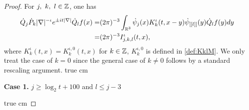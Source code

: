 \documentclass[11pt,twoside]{article}
\def\Z{\mathop{\mathbb Z\kern 0pt}\nolimits}
\def\R{\mathop{\mathbb R\kern 0pt}\nolimits}
\newcommand{\q}{\dot{Q}}
\theoremstyle{plain}
\theoremstyle{definition}
\numberwithin{equation}{section}
\begin{document}
	\begin{proof}
		For $j,\ k,\ l\in\Z$, one has
		\begin{equation*}
			\begin{split}
				\q_j\dot{P}_k |\nabla|^{-\iota}e^{\pm it|\nabla|}\q_l f(x)
				=&(2\pi)^{-3}\int_{\R^3}\dot{\psi}_j(x)K^\iota_k(t,x-y)\dot{\psi}_{[[l]]}(y)\q_lf(y)dy\\
				=&(2\pi)^{-3} I_{j,k,l}^\iota(t,x),
			\end{split}
		\end{equation*}
		where $K^\iota_k(t,x) = K^{\iota,0}_k(t,x)$ for $k \in \Z$, $K^{\iota,0}_k$ is defined in \eqref{def:KklM}.
We only treat the case of $k = 0$ since the general case of $k\not=0$ follows by a standard rescaling argument.
 true cm

	\noindent\textbf{Case 1.} $j\ge \log_2t+100$ and $l\le j-3$

 true cm


\end{proof}
\end{document}
